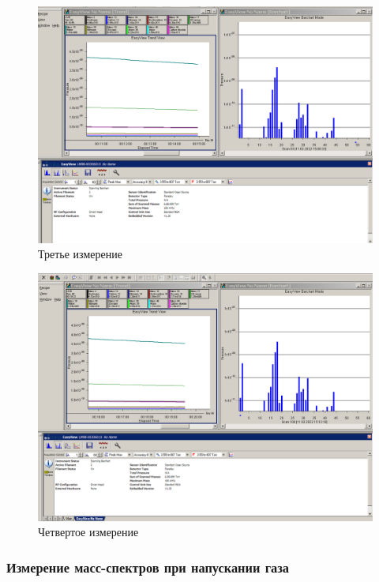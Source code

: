 \documentclass[a4paper,12pt]{article}
\begin{document}
\begin{figure}[h!!]
	\begin{center}
	\includegraphics[scale=0.4]{graph3}
	\caption{Третье измерение}
	\end{center}
\end{figure}

\newpage

\begin{figure}[h!]
	\begin{center}
	\includegraphics[scale=0.4]{graph4}
	\caption{Четвертое измерение}
	\end{center}
\end{figure}

\subsubsection*{Измерение масс-спектров при напускании газа}
\end{document}
